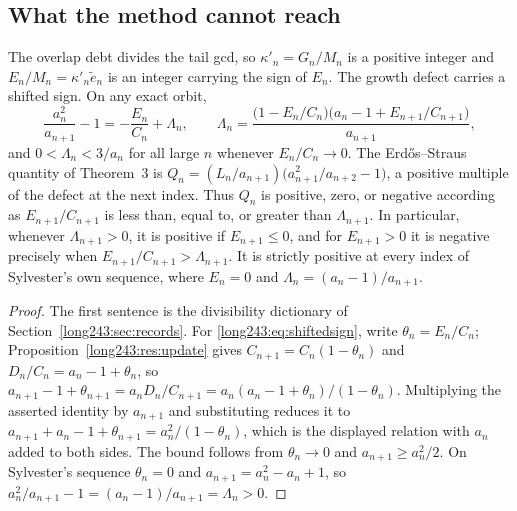 \subsection{What the method cannot reach}

\begin{proposition}\label{long243:res:classicalhalfspace}
The overlap debt divides the tail gcd, so $\kappa'_n=G_n/M_n$ is a positive
integer and $E_n/M_n=\kappa'_n\tilde e_n$ is an integer carrying the sign of
$E_n$.  The growth defect carries a shifted sign.  On any exact orbit,
\begin{equation}\label{long243:eq:shiftedsign}
 \frac{a_n^2}{a_{n+1}}-1=-\frac{E_n}{C_n}+\Lambda_n,
 \qquad
 \Lambda_n=\frac{\bigl(1-E_n/C_n\bigr)\bigl(a_n-1+E_{n+1}/C_{n+1}\bigr)}{a_{n+1}},
\end{equation}
and $0<\Lambda_n<3/a_n$ for all large $n$ whenever $E_n/C_n\to0$.  The
Erd\H{o}s--Straus quantity of Theorem~3 is
$Q_n=(L_n/a_{n+1})\bigl(a_{n+1}^2/a_{n+2}-1\bigr)$, a positive multiple of the
defect at the next index.  Thus $Q_n$ is positive, zero, or negative according
as $E_{n+1}/C_{n+1}$ is less than, equal to, or greater than
$\Lambda_{n+1}$.  In particular, whenever $\Lambda_{n+1}>0$, it is positive
if $E_{n+1}\le0$, and for $E_{n+1}>0$ it is negative precisely when
$E_{n+1}/C_{n+1}>\Lambda_{n+1}$.  It is strictly positive
at every index of Sylvester's own sequence, where $E_n=0$ and
$\Lambda_n=(a_n-1)/a_{n+1}$.
\end{proposition}

\begin{proof}
The first sentence is the divisibility dictionary of
Section~\ref{long243:sec:records}.  For \eqref{long243:eq:shiftedsign}, write
$\theta_n=E_n/C_n$; Proposition~\ref{long243:res:update} gives $C_{n+1}=C_n(1-\theta_n)$
and $D_n/C_n=a_n-1+\theta_n$, so
$a_{n+1}-1+\theta_{n+1}=a_nD_n/C_{n+1}=a_n(a_n-1+\theta_n)/(1-\theta_n)$.
Multiplying the asserted identity by $a_{n+1}$ and substituting reduces it to
$a_{n+1}+a_n-1+\theta_{n+1}=a_n^2/(1-\theta_n)$, which is the displayed
relation with $a_n$ added to both sides.  The bound follows from
$\theta_n\to0$ and $a_{n+1}\ge a_n^2/2$.  On Sylvester's sequence
$\theta_n=0$ and $a_{n+1}=a_n^2-a_n+1$, so
$a_n^2/a_{n+1}-1=(a_n-1)/a_{n+1}=\Lambda_n>0$.
\end{proof}

